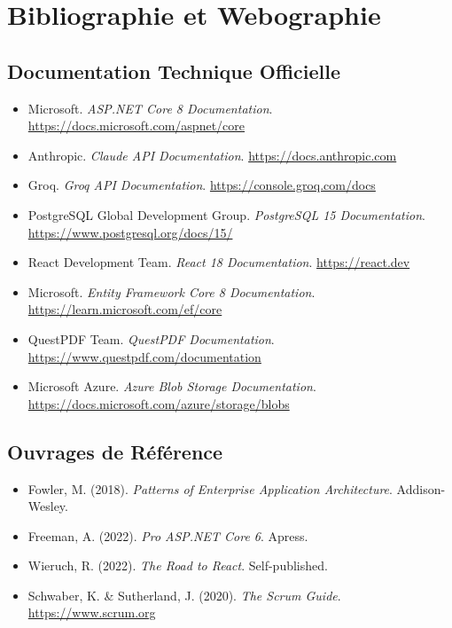 \chapter*{Bibliographie et Webographie}

\section*{Documentation Technique Officielle}

\begin{itemize}
  \item Microsoft. \textit{ASP.NET Core 8 Documentation}.
        \url{https://docs.microsoft.com/aspnet/core}
  \item Anthropic. \textit{Claude API Documentation}.
        \url{https://docs.anthropic.com}
  \item Groq. \textit{Groq API Documentation}.
        \url{https://console.groq.com/docs}
  \item PostgreSQL Global Development Group. \textit{PostgreSQL 15 Documentation}.
        \url{https://www.postgresql.org/docs/15/}
  \item React Development Team. \textit{React 18 Documentation}.
        \url{https://react.dev}
  \item Microsoft. \textit{Entity Framework Core 8 Documentation}.
        \url{https://learn.microsoft.com/ef/core}
  \item QuestPDF Team. \textit{QuestPDF Documentation}.
        \url{https://www.questpdf.com/documentation}
  \item Microsoft Azure. \textit{Azure Blob Storage Documentation}.
        \url{https://docs.microsoft.com/azure/storage/blobs}
\end{itemize}

\section*{Ouvrages de Référence}

\begin{itemize}
  \item Fowler, M. (2018). \textit{Patterns of Enterprise Application Architecture}.
        Addison-Wesley.
  \item Freeman, A. (2022). \textit{Pro ASP.NET Core 6}. Apress.
  \item Wieruch, R. (2022). \textit{The Road to React}. Self-published.
  \item Schwaber, K. \& Sutherland, J. (2020). \textit{The Scrum Guide}.
        \url{https://www.scrum.org}
\end{itemize}

